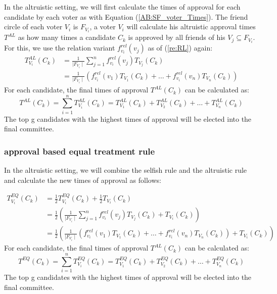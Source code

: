 \documentclass[
   a4paper,                      %
   tucfont,                      %
   english,                      %
   tuctitle,                     %
   intoc,                        %
   twoside,                      %
   captions=tableheading,        %
   openright,                    %
   final,                        %
   ]{tuc-thesis}                 %
\begin{document}
In the altruistic setting, we will first calculate the times of approval for each candidate by each voter as with Equation (\ref{AB:SF_voter_Times}). The friend circle of each voter $V_i$ is $F_{V_i}$, a voter $V_i$ will calculate his altruistic approval times $T^{AL}$ as how many times a candidate $C_k$ is approved by all friends of his $V_j \subseteq F_{V_i}$. For this, we use the relation variant $f_{v_i}^{rel}(v_j)$ as of (\ref{re:RL}) again: \begin{equation}
   \begin{split}
T_{V_i}^{AL}(C_k) &= \frac{1}{\mid F_{V_i}\mid}\sum_{j=1}^{n} f_{v_i}^{rel}(v_j)T_{V_j}(C_k) \\
            &= \frac{1}{\mid F_{V_i}\mid}(f_{v_i}^{rel}(v_1)T_{V_1}(C_k) + \dots + f_{v_i}^{rel}(v_n)T_{V_n}(C_k))\label{AB:AL_singlevoter_Times}
\end{split} 
\end{equation}
For each candidate, the final times of approval $T^{AL}(C_k)$ can be calculated as:
\begin{equation}
T^{AL}(C_k) = \sum_{i=1}^{n} T_{V_i}^{AL}(C_k)= T_{V_1}^{AL}(C_k) + T_{V_2}^{AL}(C_k) + \dots + T_{V_n}^{AL}(C_k)\label{AB:AL_aggr_voter_Times}
\end{equation}
The top g candidates with the highest times of approval will be elected into the final committee.
\subsubsection{approval based equal treatment rule}
In the altruistic setting, we will combine the selfish rule and the altruistic rule and calculate the new times of approval as follows:

\begin{equation}
   \begin{split}
T_{V_i}^{EQ}(C_k) &= \frac{1}{2}T_{V_i}^{EQ}(C_k) +\frac{1}{2}T_{V_i}(C_k)\\
                  &= \frac{1}{2}(\frac{1}{\mid F_{V_i}\mid}\sum_{j=1}^{n} f_{v_i}^{rel}(v_j)T_{V_j}(C_k)
                  +T_{V_i}(C_k))\\
                  &= \frac{1}{2}(\frac{1}{\mid F_{V_i}\mid}(f_{v_i}^{rel}(v_1)T_{V_1}(C_k) + \dots + f_{v_i}^{rel}(v_n)T_{V_n}(C_k))+T_{V_i}(C_k))\label{AB:EQ_singlevoter_Times}
\end{split}
\end{equation}
For each candidate, the final times of approval $T^{AL}(C_k)$ can be calculated as:
\begin{equation}
T^{EQ}(C_k) = \sum_{i=1}^{n} T_{V_i}^{EQ}(C_k)= T_{V_1}^{EQ}(C_k) + T_{V_2}^{EQ}(C_k) + \dots + T_{V_n}^{EQ}(C_k)\label{AB:EQ_aggr_voter_Times}
\end{equation}
The top g candidates with the highest times of approval will be elected into the final committee.
\end{document}
